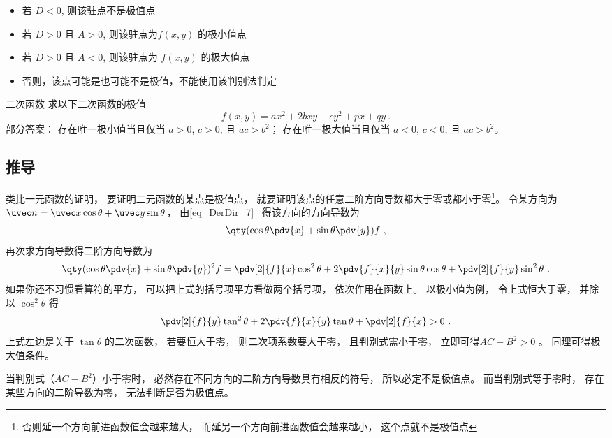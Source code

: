 \begin{itemize}
\item 若 $D<0$, 则该驻点不是极值点
\item 若 $D>0$ 且 $A>0$, 则该驻点为$f(x,y)$ 的极小值点
\item 若 $D>0$ 且 $A<0$, 则该驻点为 $f(x,y)$ 的极大值点
\item 否则，该点可能是也可能不是极值，不能使用该判别法判定
\end{itemize}

\begin{exercise}{二次函数}
求以下二次函数的极值
\begin{equation}
f(x, y) = ax^2 + 2bxy + cy^2 + px + qy~.
\end{equation}
部分答案： 存在唯一极小值当且仅当 $a>0$, $c>0$, 且 $ac>b^2$； 存在唯一极大值当且仅当 $a<0$, $c<0$, 且 $ac>b^2$。
\end{exercise}

\subsection{推导}

类比一元函数的证明， 要证明二元函数的某点是极值点， 就要证明该点的任意二阶方向导数都大于零或都小于零\footnote{否则延一个方向前进函数值会越来越大， 而延另一个方向前进函数值会越来越小， 这个点就不是极值点}。 令某方向为 $\uvec n = \uvec x \cos\theta + \uvec y \sin\theta$， 由\autoref{eq_DerDir_7}~ 得该方向的方向导数为
\begin{equation}
\qty(\cos\theta\pdv{x} + \sin\theta\pdv{y}) f~,
\end{equation}
再次求方向导数得二阶方向导数为
\begin{equation}
\qty(\cos\theta\pdv{x} + \sin\theta\pdv{y})^2 f
= \pdv[2]{f}{x} \cos^2\theta + 2\pdv{f}{x}{y} \sin\theta\cos\theta + \pdv[2]{f}{y} \sin^2\theta~.
\end{equation}
如果你还不习惯看算符的平方， 可以把上式的括号项平方看做两个括号项， 依次作用在函数上。 以极小值为例， 令上式恒大于零， 并除以 $\cos^2\theta$ 得
\begin{equation}
\pdv[2]{f}{y} \tan^2\theta + 2\pdv{f}{x}{y} \tan\theta + \pdv[2]{f}{x} > 0~.
\end{equation}
上式左边是关于 $\tan\theta$ 的二次函数， 若要恒大于零， 则二次项系数要大于零， 且判别式需小于零， 立即可得$AC-B^2>0$ 。 同理可得极大值条件。

当判别式（$AC-B^2$）小于零时， 必然存在不同方向的二阶方向导数具有相反的符号， 所以必定不是极值点。 而当判别式等于零时， 存在某些方向的二阶导数为零， 无法判断是否为极值点。

